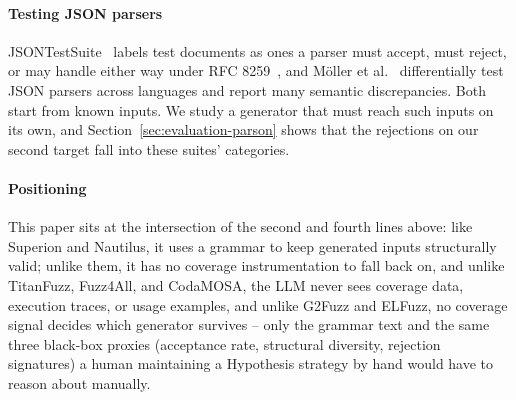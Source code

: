 \paragraph{Testing JSON parsers}
JSONTestSuite~\cite{seriot2016jsontestsuite} labels test documents as ones a
parser must accept, must reject, or may handle either way under RFC
8259~\cite{rfc8259}, and Möller et al.~\cite{moller2024crosslanguage}
differentially test JSON parsers across languages and report many semantic
discrepancies. Both start from known inputs. We study a generator that must
reach such inputs on its own, and Section~\ref{sec:evaluation-parson} shows
that the rejections on our second target fall into these suites' categories.

\paragraph{Positioning} This paper sits at the intersection of the second
and fourth lines above: like Superion and Nautilus, it uses a grammar to
keep generated inputs structurally valid; unlike them, it has no coverage
instrumentation to fall back on, and unlike TitanFuzz, Fuzz4All, and
CodaMOSA, the LLM never sees coverage data, execution traces, or usage
examples, and unlike G2Fuzz and ELFuzz, no coverage signal decides which
generator survives -- only the grammar text and the same three black-box proxies
(acceptance rate, structural diversity, rejection signatures) a human
maintaining a Hypothesis strategy by hand would have to reason about
manually.
